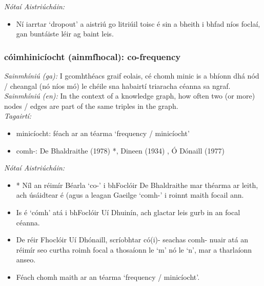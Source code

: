  \noindent \textit{Nótaí Aistriúcháin:}
\begin{itemize}
	\item Ní iarrtar `dropout' a aistriú go litriúil toisc é sin a bheith i bhfad níos foclaí, gan buntáiste léir ag baint leis.
\end{itemize}


\subsubsection*{cóimhinicíocht (ainmfhocal): co-frequency}
 \noindent \textit{Sainmhíniú (ga):} I gcomhthéacs graif eolais, cé chomh minic is a bhíonn dhá nód / cheangal (nó níos mó) le chéile sna habairtí triaracha céanna sa ngraf.
\\
 \noindent \textit{Sainmhíniú (en):} In the context of a knowledge graph, how often two (or more) nodes / edges are part of the same triples in the graph.
\\
 \noindent \textit{Tagairtí:}
\begin{itemize}
	\item minicíocht: féach ar an téarma `frequency / minicíocht'
	\item comh-: De Bhaldraithe (1978) \cite{de-bhaldraithe}*, Dineen (1934) \cite{dineen}, Ó Dónaill (1977) \cite{odonaill}
\end{itemize}

 \noindent \textit{Nótaí Aistriúcháin:}
\begin{itemize}
	\item * Níl an réimír Béarla `co-' i bhFoclóir De Bhaldraithe mar théarma ar leith, ach úsáidtear é (agus a leagan Gaeilge `comh-' i roinnt maith focail ann.
	\item Is é `cómh' atá i bhFoclóir Uí Dhuinín, ach glactar leis gurb in an focal céanna.
	\item De réir Fhoclóir Uí Dhónaill, scríobhtar có(i)- seachas comh- nuair atá an réimír seo curtha roimh focal a thosaíonn le `m' nó le `n', mar a tharlaíonn anseo.
	\item Féach chomh maith ar an téarma `frequency / minicíocht'.
\end{itemize}


